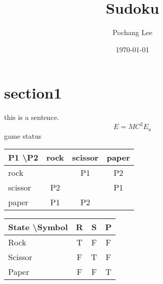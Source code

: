 \documentclass[24pt,a4paper]{article}
\begin{document}
	\title{Sudoku}
	\author{Pochang Lee}
	\date{\today}
	\maketitle
	\section{section1}
		this is a sentence.
\begin{equation}
E=MC^2
E_a
\end{equation}
game status
\begin{center}
\begin{tabular} {l | c | c | c}
	P1 \textbackslash P2 & rock & scissor & paper \\ \hline
	rock	&  & P1 & P2 \\ \hline
	scissor & P2 &  & P1 \\ \hline
	paper	& P1 & P2 & 

\end{tabular}
\end{center}

\begin{center}
\begin{tabular} {l | c | c | c}
	State \textbackslash Symbol & R & S & P \\ \hline
	Rock & {\color{green}T} & F & F \\ \hline
	Scissor & F & {\color{green}T} & F \\ \hline
	Paper & F & F & {\color{green}T} \\ \hline

\end{tabular}
\end{center}
\end{document}
